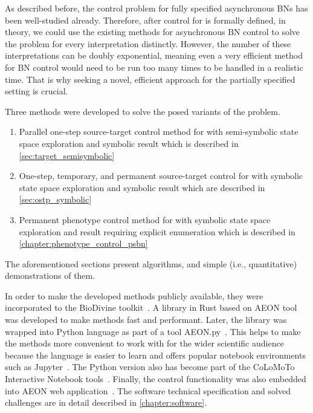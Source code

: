 \medskip


\noindent{}\hspace{3pt} As described before, the control problem for fully specified asynchronous BNs has been well-studied already. Therefore, after control for \PBN{} is formally defined, in theory, we could use the existing methods for asynchronous BN control to solve the problem for every interpretation distinctly. However, the number of these interpretations can be doubly exponential, meaning even a very efficient method for BN control would need to be run too many times to be handled in a realistic time. That is why seeking a novel, efficient approach for the partially specified setting is crucial.

Three methods were developed to solve the posed variants of the problem.

\begin{enumerate}
    \item Parallel one-step source-target control method for \PBN{} with semi-symbolic state space exploration and symbolic result which is described in \autoref{sec:target_semisymbolic}~\cite{Brim2021}
    \item One-step, temporary, and permanent source-target control for \PBN{} with symbolic state space exploration and symbolic result which are described in \autoref{sec:ostp_symbolic}~\cite{brim2022}
    \item Permanent phenotype control method for \PBN{} with symbolic state space exploration and result requiring explicit enumeration which is described in \autoref{chapter:phenotype_control_psbn}~\cite{Benes2023b}
\end{enumerate}

The aforementioned sections present algorithms, and simple (i.e., quantitative) demonstrations of them.

\medskip

\noindent{} \hspace{3pt} In order to make the developed methods publicly available, they were incorporated to the BioDivine toolkit~\cite{Barnat2009}. A library in Rust based on AEON tool~\cite{aeon} was developed to make methods fast and performant. Later, the library was wrapped into Python language as part of a tool AEON.py~\cite{aeonpy}. This helps to make the methods more convenient to work with for the wider scientific audience because the language is easier to learn and offers popular notebook environments such as Jupyter~\cite{Barba2021}. The Python version also has become part of the CoLoMoTo Interactive Notebook tools~\cite{Naldi2015,Levy2018}. Finally, the control functionality was also embedded into AEON web application~\cite{Vesely2025}. The software technical specification and solved challenges are in detail described in \autoref{chapter:software}.

